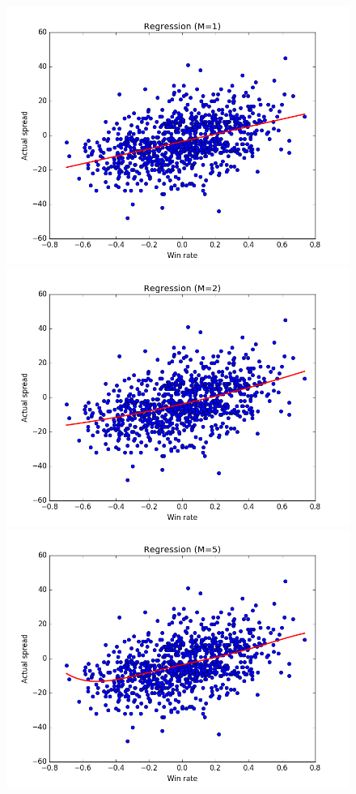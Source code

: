 \documentclass{article}
\begin{document}
\begin{figure}[width=\linewidth]
\centering
\begin{multicols}{2}
  \includegraphics[width=1.2\linewidth]{code/figures/linear_regression(m=1).png}
  \includegraphics[width=1.2\linewidth]{code/figures/linear_regression(m=2).png}
  \includegraphics[width=1.2\linewidth]{code/figures/linear_regression(m=5).png}

\end{multicols}
\end{figure}
\end{document}
